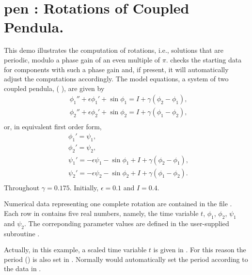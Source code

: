 \documentclass[12pt]{report}
\def\eps{\epsilon}
\begin{document}
\newpage
\section{ pen : Rotations of Coupled Pendula.} \label{sec:Demos_pen}
This demo illustrates the computation of rotations, i.e., solutions that
are periodic, modulo a phase gain of an even multiple of $\pi$.
\AUTO checks the starting data for components with such a phase gain
and, if present, it will automatically adjust the computations accordingly.
The model equations, a system of two coupled  pendula, 
( \citeyear{DoArOt:91}),
are given by
\begin{equation} \begin{array}{cl}
 & \phi_1'' + \eps \phi_1' + \sin \phi_1 
  = I + \gamma(\phi_2-\phi_1), \\
 & \phi_2'' + \eps \phi_2' + \sin \phi_2 
  = I + \gamma(\phi_1-\phi_2) ,\\
\end{array} \end{equation}
or, in equivalent first order form,
\begin{equation} \begin{array}{cl}
 & \phi_1'  =  \psi_1, \\
 & \phi_2'  =  \psi_2, \\
 & \psi_1'  = - \eps \psi_1 - \sin \phi_1 + I + \gamma(\phi_2-\phi_1), \\
 & \psi_2'  = - \eps \psi_2 - \sin \phi_2 + I + \gamma(\phi_1-\phi_2).\\
\end{array} \end{equation}
Throughout $\gamma=0.175$. Initially, $\eps=0.1$ and $I=0.4$.

Numerical data representing one complete rotation are
contained in the file . 
Each row in  contains five real numbers, namely,
the time variable $t$, $\phi_1$, $\phi_2$, $\psi_1$ and $\psi_2$.
The correponding parameter values are defined in the user-supplied subroutine
.

Actually, in this example, a scaled time variable $t$ is given in . 
For this reason the period () is also set in .
Normally \AUTO would automatically set the period according to
the data in .
\end{document}
